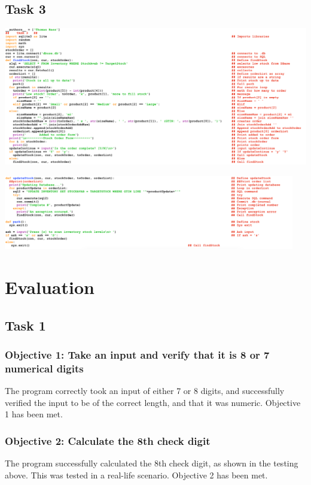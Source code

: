 \documentclass[a4paper]{article}
\begin{document}
\subsection{Task 3}
\noindent\includegraphics[width=1\textwidth, left]{task3FINALCODE1.png} \par
\noindent\includegraphics[width=0.955\textwidth, left]{task3FINALCODE2.png} \par

\newpage
\section{Evaluation}
\subsection{Task 1}
\subsubsection{Objective 1: Take an input and verify that it is 8 or 7 numerical digits}
The program correctly took an input of either 7 or 8 digits, and successfully verified the input to be of the correct length, and that it was numeric. Objective 1 has been met.
\subsubsection{Objective 2: Calculate the 8th check digit}
The program successfully calculated the 8th check digit, as shown in the testing above. This was tested in a real-life scenario. Objective 2 has been met.
\end{document}
